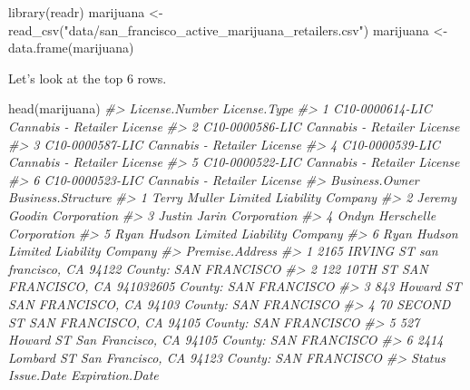 \documentclass[
]{krantz}
\makeatletter
\newenvironment{Shaded}{\begin{snugshade}}{\end{snugshade}}
\newcommand{\CommentTok}[1]{\textcolor[rgb]{0.37,0.37,0.37}{\textit{#1}}}
\newcommand{\FunctionTok}[1]{\textcolor[rgb]{0,0,0}{#1}}
\newcommand{\NormalTok}[1]{#1}
\newcommand{\OtherTok}[1]{\textcolor[rgb]{0.37,0.37,0.37}{#1}}
\newcommand{\StringTok}[1]{\textcolor[rgb]{0.5,0.5,0.5}{#1}}
\newenvironment{kframe}{%
\medskip{}
\setlength{\fboxsep}{.8em}
 \def\at@end@of@kframe{}%
 \ifinner\ifhmode%
  \def\at@end@of@kframe{\end{minipage}}%
  \begin{minipage}{\columnwidth}%
 \fi\fi%
 \def\FrameCommand##1{\hskip\@totalleftmargin \hskip-\fboxsep
 \colorbox{shadecolor}{##1}\hskip-\fboxsep
     \hskip-\linewidth \hskip-\@totalleftmargin \hskip\columnwidth}%
 \MakeFramed {\advance\hsize-\width
   \@totalleftmargin\z@ \linewidth\hsize
   \@setminipage}}%
 {\par\unskip\endMakeFramed%
 \at@end@of@kframe}
\renewenvironment{Shaded}{\begin{kframe}}{\end{kframe}}
\makeatother
\begin{document}
\begin{Shaded}
\begin{Highlighting}[]
\FunctionTok{library}\NormalTok{(readr)}
\NormalTok{marijuana }\OtherTok{\textless{}{-}} \FunctionTok{read\_csv}\NormalTok{(}\StringTok{"data/san\_francisco\_active\_marijuana\_retailers.csv"}\NormalTok{)}
\NormalTok{marijuana }\OtherTok{\textless{}{-}} \FunctionTok{data.frame}\NormalTok{(marijuana)}
\end{Highlighting}
\end{Shaded}

Let's look at the top 6 rows.

\begin{Shaded}
\begin{Highlighting}[]
\FunctionTok{head}\NormalTok{(marijuana)}
\CommentTok{\#\textgreater{}    License.Number                License.Type}
\CommentTok{\#\textgreater{} 1 C10{-}0000614{-}LIC Cannabis {-} Retailer License}
\CommentTok{\#\textgreater{} 2 C10{-}0000586{-}LIC Cannabis {-} Retailer License}
\CommentTok{\#\textgreater{} 3 C10{-}0000587{-}LIC Cannabis {-} Retailer License}
\CommentTok{\#\textgreater{} 4 C10{-}0000539{-}LIC Cannabis {-} Retailer License}
\CommentTok{\#\textgreater{} 5 C10{-}0000522{-}LIC Cannabis {-} Retailer License}
\CommentTok{\#\textgreater{} 6 C10{-}0000523{-}LIC Cannabis {-} Retailer License}
\CommentTok{\#\textgreater{}     Business.Owner        Business.Structure}
\CommentTok{\#\textgreater{} 1     Terry Muller Limited Liability Company}
\CommentTok{\#\textgreater{} 2    Jeremy Goodin               Corporation}
\CommentTok{\#\textgreater{} 3     Justin Jarin               Corporation}
\CommentTok{\#\textgreater{} 4 Ondyn Herschelle               Corporation}
\CommentTok{\#\textgreater{} 5      Ryan Hudson Limited Liability Company}
\CommentTok{\#\textgreater{} 6      Ryan Hudson Limited Liability Company}
\CommentTok{\#\textgreater{}                                                 Premise.Address}
\CommentTok{\#\textgreater{} 1  2165 IRVING ST san francisco, CA 94122 County: SAN FRANCISCO}
\CommentTok{\#\textgreater{} 2 122 10TH ST SAN FRANCISCO, CA 941032605 County: SAN FRANCISCO}
\CommentTok{\#\textgreater{} 3   843 Howard ST SAN FRANCISCO, CA 94103 County: SAN FRANCISCO}
\CommentTok{\#\textgreater{} 4    70 SECOND ST SAN FRANCISCO, CA 94105 County: SAN FRANCISCO}
\CommentTok{\#\textgreater{} 5   527 Howard ST San Francisco, CA 94105 County: SAN FRANCISCO}
\CommentTok{\#\textgreater{} 6 2414 Lombard ST San Francisco, CA 94123 County: SAN FRANCISCO}
\CommentTok{\#\textgreater{}   Status Issue.Date Expiration.Date}

\end{Highlighting}
\end{Shaded}
\end{document}
